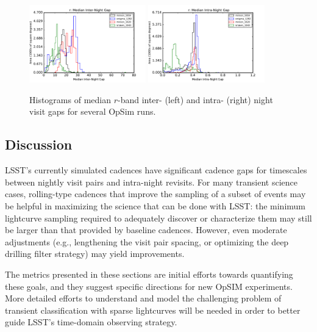 \begin{figure}[hbt]
\centerline{
	\includegraphics[width=0.45\textwidth]{figs/transients/median_internight_gap_r.pdf}
	\includegraphics[width=0.45\textwidth]{figs/transients/median_intranight_gap_r.pdf}
}
\caption{
Histograms of median $r$-band inter- (left) and intra- (right) night visit gaps for several OpSim runs.
}
\label{fig:tgaps}
\end{figure}




\subsection{Discussion}
\label{sec:\chpname:discussion}

LSST's currently simulated cadences have significant cadence gaps for
timescales between nightly visit pairs and intra-night revisits.
For many transient science cases, rolling-type cadences that improve the
sampling of a subset of events may be helpful in maximizing the science
that can be done with LSST: the minimum lightcurve sampling required to
adequately discover or characterize them may still be larger than that
provided by baseline cadences.  However, even moderate adjustments (e.g.,
lengthening the visit pair spacing, or optimizing the deep drilling filter
strategy) may yield improvements.

The metrics presented in these sections are initial efforts towards
quantifying these goals, and they suggest specific directions for new OpSIM
experiments.  More detailed efforts to understand and model 
the challenging problem
of transient classification with sparse lightcurves will be needed in order
to better guide LSST's time-domain observing strategy.

